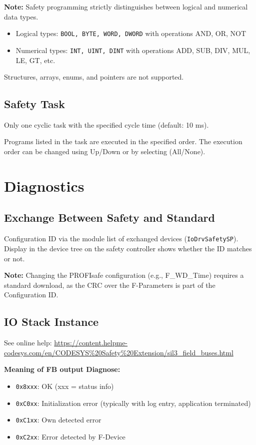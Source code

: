 \documentclass[a4paper,12pt]{article}
\begin{document}
\textbf{Note:} Safety programming strictly distinguishes between logical and numerical data types.

\begin{itemize}
	\item Logical types: \texttt{BOOL, BYTE, WORD, DWORD} with operations AND, OR, NOT
	\item Numerical types: \texttt{INT, UINT, DINT} with operations ADD, SUB, DIV, MUL, LE, GT, etc.
\end{itemize}

Structures, arrays, enums, and pointers are not supported.

\subsection{Safety Task}

Only one cyclic task with the specified cycle time (default: 10 ms).

Programs listed in the task are executed in the specified order. The execution order can be changed using Up/Down or by selecting (All/None).

\section{Diagnostics}

\subsection{Exchange Between Safety and Standard}

Configuration ID via the module list of exchanged devices (\texttt{IoDrvSafetySP}). Display in the device tree on the safety controller shows whether the ID matches or not.

\textbf{Note:} Changing the PROFIsafe configuration (e.g., F\_WD\_Time) requires a standard download, as the CRC over the F-Parameters is part of the Configuration ID.

\subsection*{IO Stack Instance}

See online help: \url{https://content.helpme-codesys.com/en/CODESYS%20Safety%20Extension/sil3_field_buses.html}

\textbf{Meaning of FB output Diagnose:}
\begin{itemize}
	\item \texttt{0x8xxx}: OK (xxx = status info)
	\item \texttt{0xC0xx}: Initialization error (typically with log entry, application terminated)
	\item \texttt{0xC1xx}: Own detected error
	\item \texttt{0xC2xx}: Error detected by F-Device
\end{itemize}
\end{document}
